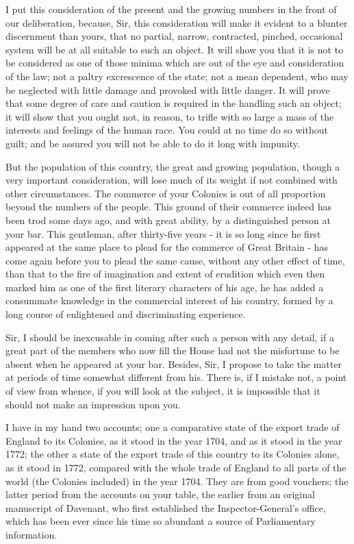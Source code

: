 I put this consideration of the present and the growing numbers in the front of our deliberation, because, Sir, this consideration will make it evident to a blunter discernment than yours, that no partial, narrow, contracted, pinched, occasional system will be at all suitable to such an object. It will show you that it is not to be considered as one of those minima which are out of the eye and consideration of the law; not a paltry excrescence of the state; not a mean dependent, who may be neglected with little damage and provoked with little danger. It will prove that some degree of care and caution is required in the handling such an object; it will show that you ought not, in reason, to trifle with so large a mass of the interests and feelings of the human race. You could at no time do so without guilt; and be assured you will not be able to do it long with impunity.\par

But the population of this country, the great and growing population, though a very important consideration, will lose much of its weight if not combined with other circumstances. The commerce of your Colonies is out of all proportion beyond the numbers of the people. This ground of their commerce indeed has been trod some days ago, and with great ability, by a distinguished person at your bar. This gentleman, after thirty-five years - it is so long since he first appeared at the same place to plead for the commerce of Great Britain - has come again before you to plead the same cause, without any other effect of time, than that to the fire of imagination and extent of erudition which even then marked him as one of the first literary characters of his age, he has added a consummate knowledge in the commercial interest of his country, formed by a long course of enlightened and discriminating experience.\par

Sir, I should be inexcusable in coming after such a person with any detail, if a great part of the members who now fill the House had not the misfortune to be absent when he appeared at your bar. Besides, Sir, I propose to take the matter at periods of time somewhat different from his. There is, if I mistake not, a point of view from whence, if you will look at the subject, it is impossible that it should not make an impression upon you.\par

I have in my hand two accounts; one a comparative state of the export trade of England to its Colonies, as it stood in the year 1704, and as it stood in the year 1772; the other a state of the export trade of this country to its Colonies alone, as it stood in 1772, compared with the whole trade of England to all parts of the world (the Colonies included) in the year 1704. They are from good vouchers; the latter period from the accounts on your table, the earlier from an original manuscript of Davenant, who first established the Inspector-General’s office, which has been ever since his time so abundant a source of Parliamentary information.\par

